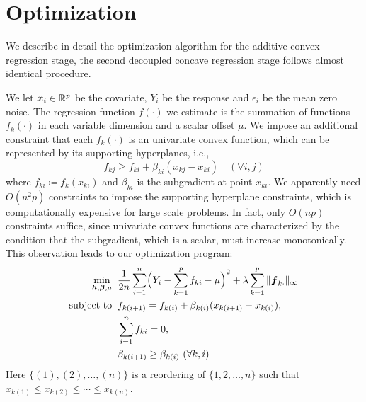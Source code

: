 \section{Optimization}

We describe in detail the optimization algorithm for the additive convex regression stage, the second decoupled concave regression stage follows almost identical procedure. 

We let $\boldsymbol{x}_{i}\in\mathbb{R}^{p}$ be the covariate, $Y_{i}$ be the
response and $\epsilon_{i}$ be the mean zero noise. The regression function $f(\cdot)$ we estimate is the summation of 
functions $f_{k}(\cdot)$ in each variable dimension and a scalar offset $\mu$.  
We impose an additional constraint that each $f_{k}(\cdot)$ is 
an univariate convex function, which can be represented by its supporting hyperplanes, i.e.,
\begin{equation}\label{hyper}
      f_{kj} \geq f_{ki} + \beta_{ki}(x_{kj}-x_{ki}) \quad (\forall i,j)
\end{equation}
where $f_{ki}\coloneqq f_{k}(x_{ki})$ and $\beta_{ki}$ is the
subgradient at point $x_{ki}$. We apparently need $O(n^2 p)$ constraints to
impose the supporting hyperplane constraints, which is computationally
expensive for large scale problems.  In fact, only $O(np)$
constraints suffice, since univariate convex functions are
characterized by the condition that the subgradient, which is a scalar, must
increase monotonically. This observation leads to our optimization
program:
\begin{equation}
\begin{split}
       \min_{\bds{h},\bds{\beta},\mu} & \;\; \frac{1}{2n}\sum_{i=1}^{n}
                     \Bigl( Y_{i}-\sum_{k=1}^{p}f_{ki} - \mu \Bigr)^{2} 
                         + \lambda\sum_{k=1}^{p}\|\bds{f}_{k\cdot}\|_{\infty} \\
       \textrm{subject to} &\;\; f_{k(i+1)} = f_{k(i)} + \beta_{k(i)}(x_{k(i+1)}-x_{k(i)}), \\
                     & \;\; \sum_{i=1}^{n}f_{ki}=0,\\
                     & \;\; \beta_{k(i+1)} \geq \beta_{k(i)} \ (\forall k, i)
\end{split}
\label{np}
\end{equation}
Here $\{(1),(2),\ldots,(n)\}$ is a reordering of $\{1,2,\ldots,n\}$ such that $x_{k(1)}\leq{}x_{k(2)}\leq\cdots\leq{}x_{k(n)}$. 

